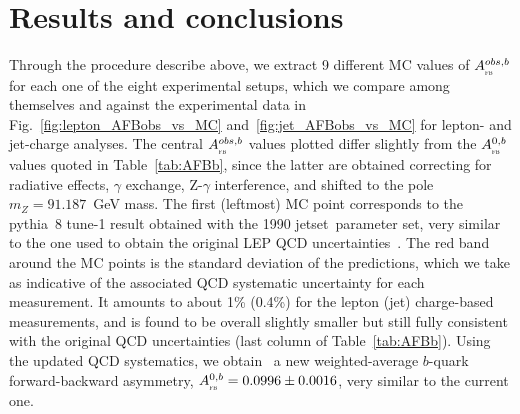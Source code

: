 \documentclass{moriond}
\newcommand{\AFBb}  {A_{_{\textsc{fb}}}^{0,b}}
\newcommand{\AFBobs}  {A_{_{\textsc{fb}}}^{obs,b}}
\newcommand{\pythia}{{\sc pythia}}
\newcommand{\jetset}{{\sc jetset}}
\begin{document}

\section{Results and conclusions}
\label{sec:}

Through the procedure describe above, we extract 9 different MC values of $\AFBobs$ 
for each one of the eight experimental setups, which we compare among themselves and against 
the experimental data in Fig.~\ref{fig:lepton_AFBobs_vs_MC} and~\ref{fig:jet_AFBobs_vs_MC}
for lepton- and jet-charge analyses. %
The central $\AFBobs$ values plotted differ slightly 
from the $\AFBb$ values quoted in Table~\ref{tab:AFBb}, since the latter are obtained correcting for radiative 
effects, $\gamma$ exchange, Z-$\gamma$ interference, and shifted to the pole $m_Z = 91.187$~GeV mass. 
The first (leftmost) MC point corresponds to the
\pythia~8 tune-1 result obtained with the 1990 \jetset\ parameter set, very similar to the
one used to obtain the original LEP QCD %
uncertainties~\cite{Abbaneo:1998xt}. 
The red band around the MC points is the standard deviation of the predictions, 
which we take as indicative of the associated QCD systematic uncertainty for each measurement. It amounts to
about 1\% (0.4\%) for the lepton (jet) charge-based measurements, and is found to be overall slightly smaller but
still fully consistent with the original QCD uncertainties (last column of Table~\ref{tab:AFBb}).
Using the updated QCD systematics, we obtain~\cite{DdEYan} a new weighted-average $b$-quark 
forward-backward asymmetry, $\AFBb = 0.0996\pm0.0016$, very similar to the current one.
\end{document}
